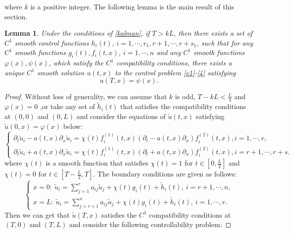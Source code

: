 \documentclass[a4paper,reqno,11pt]{amsart}
\numberwithin{equation}{section} %
\newtheorem{lem}{Lemma}[section]
\begin{document}
where $k$ is a positive integer. The following lemma is the main result of this section.
\begin{lem}\label{lem:linear}
Under the conditions of \eqref{kalman}, if $T>kL$, then there exists a set of $C^1$ smooth control functions $h_i(t)$, $i=1,\cdots ,r_1, r+1,\cdots ,r+s_1$, such that for any $C^1$ smooth functions $g_i(t), f_i(t,x)$, $i=1,\cdots ,n$ and any $C^1$ smooth functions $\varphi (x), \psi (x)$, which satisfy the $C^1$ compatibility conditions, there exists a unique $C^1$ smooth solution $u(t,x)$ to the control problem \eqref{e1}-\eqref{4} satisfying
	\begin{equation}\label{5}
        u(T,x)=\psi(x).
    \end{equation}
\end{lem}
\begin{proof}
	Without loss of generality, we can assume that $k$ is odd, $T-kL < \frac{L}{4}$ and $\varphi (x)=0$ ,or take any set of $\tilde{h}_i(t)$ that satisfies the compatibility conditions at $(0,0)$ and $(0,L)$ and consider the equations of $\tilde{u}(t,x)$ satisfying $\tilde{u}(0,x)= \varphi(x)$ below:
	\begin{equation}\label{e4}
		\left\{\begin{array}{l}
		\partial_t \tilde{u} _i- a(t,x)\partial_x \tilde{u} _i=\chi (t)f^{(1)}_i(t,x)(\partial_t - a(t,x)\partial_x)f^{(2)}_i(t,x), i=1, \cdots, r, \\
		\partial_t \tilde{u} _i+ a(t,x)\partial_x \tilde{u} _i=\chi (t)f^{(1)}_i(t,x)(\partial_t + a(t,x)\partial_x)f^{(2)}_i(t,x), i=r+1, \cdots, r+s.
		\end{array}\right.
	\end{equation}
where $\chi (t)$ is a smooth function that satisfies $\chi (t)=1$ for $t\in [0,\frac{L}{2}]$ and $\chi (t)=0$ for $t\in [T-\frac{L}{2},T]$. The boundary conditions are given as follows:
\begin{equation}\label{e5}
		\left\{ \begin{array}{l}
		x=0:\ \tilde{u} _i=\sum_{j=1}^r{a_{ij}\tilde{u} _j + \chi (t)g_i(t) + \tilde{h} _i\left( t \right) ,\ i=r+1,\cdots ,n,}\\
		x=L:\ \tilde{u} _i=\sum_{j=r+1}^n{a_{ij}\tilde{u} _j +\chi (t)g_i(t) + \tilde{h} _i\left( t \right) ,\ i=1,\cdots ,r.}
		\end{array} \right. 
	\end{equation}
Then we can get that $\tilde{u}(T,x)$ satisfies the $C^1$ compatibility conditions at $(T,0)$ and $(T,L)$ and consider the following controllability problem:

\end{proof}
\end{document}
